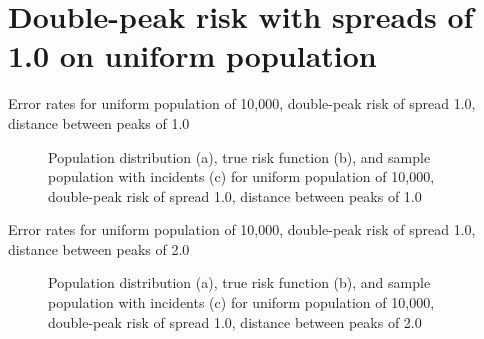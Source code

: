 \section{Double-peak risk with spreads of 1.0 on uniform population}
\label{sec:app:results_unif_100_1_2h_X}

\graphicspath{{./results/unif_100_1_2h_1/}}
\makeatletter
{}
\makeatother

\begin{table}[H]
    
    \caption[]{Error rates for uniform population of 10,000, double-peak risk of \gls{spread} 1.0, distance between peaks of 1.0}
    \label{tab:mean_error_rates:unif_100_1_2h_1}
\end{table}

\begin{figure}[H]
    
    \caption[]{Population distribution (a), true risk function (b), and sample population with incidents (c) for uniform population of 10,000, double-peak risk of \gls{spread} 1.0, distance between peaks of 1.0}
    \label{fig:distributions:unif_100_1_2h_1}    
\end{figure}

\graphicspath{{./results/unif_100_1_2h_2/}}
\makeatletter
{}
\makeatother

\begin{table}[H]
    
    \caption[]{Error rates for uniform population of 10,000, double-peak risk of \gls{spread} 1.0, distance between peaks of 2.0}
    \label{tab:mean_error_rates:unif_100_1_2h_2}
\end{table}

\begin{figure}[H]
    
    \caption[]{Population distribution (a), true risk function (b), and sample population with incidents (c) for uniform population of 10,000, double-peak risk of \gls{spread} 1.0, distance between peaks of 2.0}
    \label{fig:distributions:unif_100_1_2h_2}    
\end{figure}

